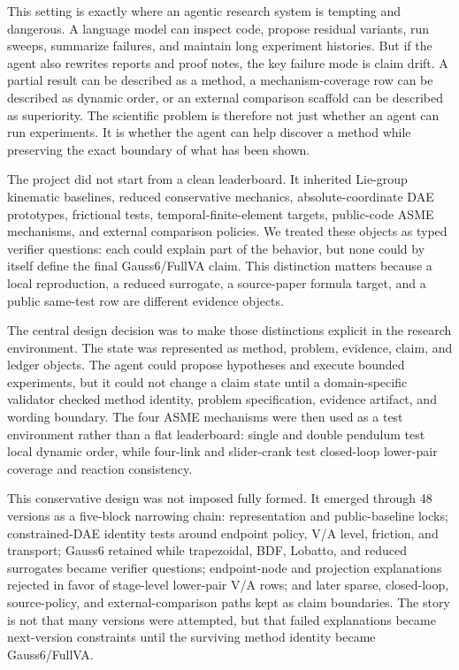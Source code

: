 \documentclass[10pt]{article}
\newcommand{\method}{Gauss6/\allowbreak FullVA}
\begin{document}
This setting is exactly where an agentic research system is tempting and
dangerous. A language model can inspect code, propose residual variants, run
sweeps, summarize failures, and maintain long experiment histories. But if the
agent also rewrites reports and proof notes, the key failure mode is claim
drift. A partial result can be described as a method, a mechanism-coverage row
can be described as dynamic order, or an external comparison scaffold can be
described as superiority. The scientific problem is therefore not just whether
an agent can run experiments. It is whether the agent can help discover a
method while preserving the exact boundary of what has been shown.

The project did not start from a clean leaderboard. It inherited Lie-group
kinematic baselines, reduced conservative mechanics, absolute-coordinate DAE
prototypes, frictional tests, temporal-finite-element targets, public-code ASME
mechanisms, and external comparison policies. We treated these objects as typed
verifier questions: each could explain part of the behavior, but none could by itself
define the final \method{} claim. This distinction matters because a local
reproduction, a reduced surrogate, a source-paper formula target, and a public
same-test row are different evidence objects.

The central design decision was to make those distinctions explicit in the
research environment. The state was represented as method, problem, evidence,
claim, and ledger objects. The agent could propose hypotheses and execute
bounded experiments, but it could not change a claim state until a
domain-specific validator checked method identity, problem specification,
evidence artifact, and wording boundary. The four ASME mechanisms were then
used as a test environment rather than a flat leaderboard: single and double
pendulum test local dynamic order, while four-link and slider-crank test
closed-loop lower-pair coverage and reaction consistency.

This conservative design was not imposed fully formed. It emerged through 48
versions as a five-block narrowing chain: representation and public-baseline
locks; constrained-DAE identity tests around endpoint policy, V/A level,
friction, and transport; Gauss6 retained while trapezoidal, BDF, Lobatto, and
reduced surrogates became verifier questions; endpoint-node and projection
explanations rejected in favor of stage-level lower-pair V/A rows; and later
sparse, closed-loop, source-policy, and external-comparison paths kept as claim
boundaries. The story is not that many versions were attempted, but that failed
explanations became next-version constraints until the surviving method
identity became \method{}.
\end{document}
